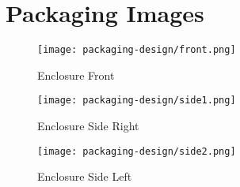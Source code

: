 \chapter{Packaging Images}

\begin{figure}[h]
	\centering
	\texttt{[image: packaging-design/front.png]}
	\caption{Enclosure Front}
	\label{fig:front}
\end{figure}

\begin{figure}[h]
	\centering
	\texttt{[image: packaging-design/side1.png]}
	\caption{Enclosure Side Right}
	\label{fig:side1}
\end{figure}

\begin{figure}[h]
	\centering
	\texttt{[image: packaging-design/side2.png]}
	\caption{Enclosure Side Left}
	\label{fig:side2}
\end{figure}
